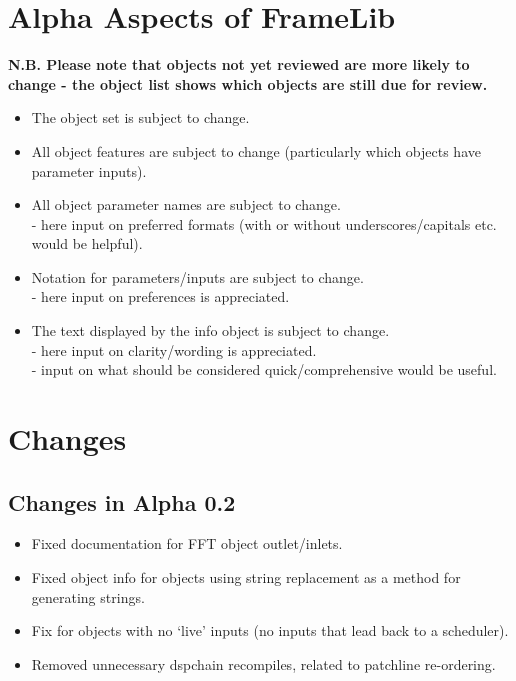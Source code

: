 \documentclass{article}
\begin{document}
\section{Alpha Aspects of FrameLib}
\vspace{0.1in}

\textbf{N.B. Please note that objects not yet reviewed are more likely to change - the object list shows which objects are still due for review.}

 \begin{itemize}
\item{The object set is subject to change.}
\item{All object features are subject to change (particularly which objects have parameter inputs).}
\item{All object parameter names are subject to change. \\
 - here input on preferred formats (with or without underscores/capitals etc. would be helpful).}
\item{Notation for parameters/inputs are subject to change. \\
 - here input on preferences is appreciated.}
\item{The text displayed by the info object is subject to change. \\
 - here input on clarity/wording is appreciated. \\
 - input on what should be considered quick/comprehensive would be useful.}
  \end{itemize}
  
\pagebreak

\section{Changes}

\subsection{Changes in Alpha 0.2}
\vspace{0.1in}

\begin{itemize}
\item Fixed documentation for FFT object outlet/inlets.
\item Fixed object info for objects using string replacement as a method for generating strings.
\item Fix for objects with no `live' inputs (no inputs that lead back to a scheduler).
\item Removed unnecessary dspchain recompiles, related to patchline re-ordering.
\end{itemize}
\end{document}
